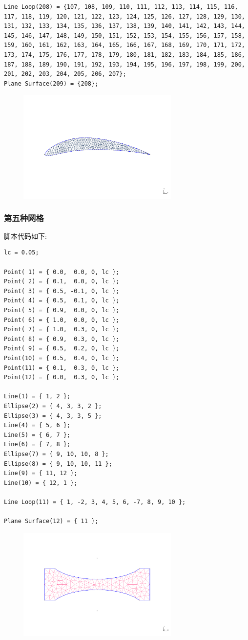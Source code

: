 \documentclass[12pt]{article}
\begin{document}
\begin{CJK}{UTF8}{gkai}
\begin{verbatim}
Line Loop(208) = {107, 108, 109, 110, 111, 112, 113, 114, 115, 116, 117, 118, 119, 120, 121, 122, 123, 124, 125, 126, 127, 128, 129, 130, 131, 132, 133, 134, 135, 136, 137, 138, 139, 140, 141, 142, 143, 144, 145, 146, 147, 148, 149, 150, 151, 152, 153, 154, 155, 156, 157, 158, 159, 160, 161, 162, 163, 164, 165, 166, 167, 168, 169, 170, 171, 172, 173, 174, 175, 176, 177, 178, 179, 180, 181, 182, 183, 184, 185, 186, 187, 188, 189, 190, 191, 192, 193, 194, 195, 196, 197, 198, 199, 200, 201, 202, 203, 204, 205, 206, 207};
Plane Surface(209) = {208};
\end{verbatim}
\begin{figure}[H]
	\centering
	\includegraphics[width=8cm]{air.png}
	\caption{}  		
\end{figure}
\subsubsection{第五种网格}
脚本代码如下:\\
\begin{verbatim}
lc = 0.05;

Point( 1) = { 0.0,  0.0, 0, lc };
Point( 2) = { 0.1,  0.0, 0, lc };
Point( 3) = { 0.5, -0.1, 0, lc };
Point( 4) = { 0.5,  0.1, 0, lc };
Point( 5) = { 0.9,  0.0, 0, lc };
Point( 6) = { 1.0,  0.0, 0, lc };
Point( 7) = { 1.0,  0.3, 0, lc };
Point( 8) = { 0.9,  0.3, 0, lc };
Point( 9) = { 0.5,  0.2, 0, lc };
Point(10) = { 0.5,  0.4, 0, lc };
Point(11) = { 0.1,  0.3, 0, lc };
Point(12) = { 0.0,  0.3, 0, lc };

Line(1) = { 1, 2 };
Ellipse(2) = { 4, 3, 3, 2 };
Ellipse(3) = { 4, 3, 3, 5 };
Line(4) = { 5, 6 };
Line(5) = { 6, 7 };
Line(6) = { 7, 8 };
Ellipse(7) = { 9, 10, 10, 8 };
Ellipse(8) = { 9, 10, 10, 11 };
Line(9) = { 11, 12 };
Line(10) = { 12, 1 };

Line Loop(11) = { 1, -2, 3, 4, 5, 6, -7, 8, 9, 10 };

Plane Surface(12) = { 11 };
\end{verbatim}
\begin{figure}[H]
	\centering
	\includegraphics[width=8cm]{ao.png}
	\caption{}  		
\end{figure}

\end{CJK}
\end{document}
